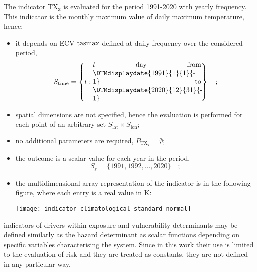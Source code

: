 \begin{example}
  The \gls{indicator} $\mathrm{TX_x}$ is evaluated for the period 1991-2020 with yearly frequency. This \gls{indicator} is the monthly maximum value of daily maximum temperature,\cite{ETCCDIClimate} hence:
  \begin{itemize}
    \item it depends on \gls{ECV} $\mathrm{tasmax}$ defined at daily frequency over the considered period,
      \begin{equation*}
        S_\text{time} = \left\{ t : \parbox{0.45\linewidth}{$t$ day from \DTMdisplaydate{1991}{1}{1}{-1} to \DTMdisplaydate{2020}{12}{31}{-1}} \right\}
        \quad ;
      \end{equation*}
    \item spatial dimensions are not specified, hence the evaluation is performed for each point of an arbitrary set $S_\text{lat} \times S_\text{lon}$;
    \item no additional parameters are required, $P_\mathrm{TX_x} = \emptyset$;
    \item the outcome is a scalar value for each year in the period,
      \begin{equation*}
        S_\text{y} = \{ 1991, 1992, \dots, 2020 \}
        \quad ;
      \end{equation*}
    \item the multidimensional array representation of the \gls{indicator} is in the following figure, where each entry is a real value in \unit{\kelvin}:
      \begin{center}
        \texttt{[image: indicator\_climatological\_standard\_normal]}
      \end{center}
  \end{itemize}
\end{example}

\Glspl{indicator} of \glspl{driver} within \gls{exposure} and \gls{vulnerability} \glspl{determinant} may be defined similarly as the \gls{hazard} \gls{determinant} as scalar functions depending on specific variables characterising the system. Since in this work their use is limited to the evaluation of \gls{risk} and they are treated as constants, they are not defined in any particular way.

